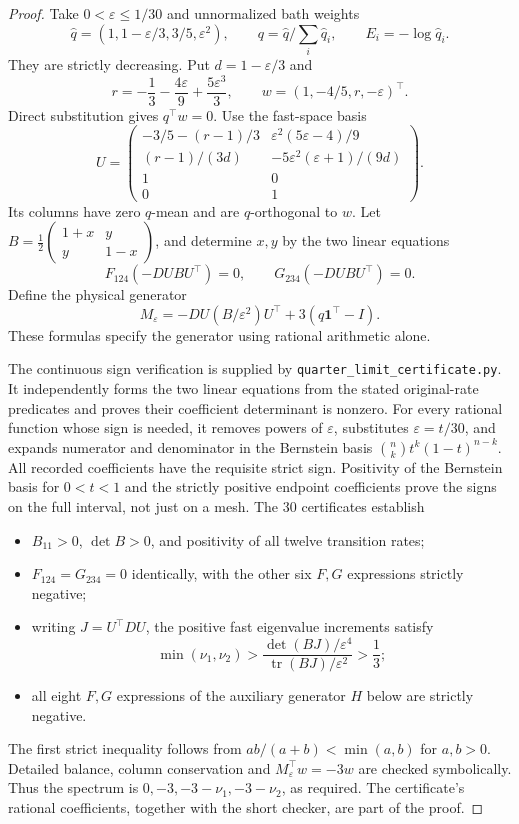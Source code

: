 \documentclass[11pt]{article}
\begin{document}
\begin{proof}
Take $0<\varepsilon\leq1/30$ and unnormalized bath weights
\[
\widehat q=(1,1-\varepsilon/3,3/5,\varepsilon^2),\qquad
q=\widehat q/\sum_i\widehat q_i,\qquad E_i=-\log\widehat q_i.
\]
They are strictly decreasing. Put $d=1-\varepsilon/3$ and
\[
r=-\frac13-\frac{4\varepsilon}{9}+\frac{5\varepsilon^3}{3},\qquad
w=(1,-4/5,r,-\varepsilon)^\top.
\]
Direct substitution gives $q^\top w=0$. Use the fast-space basis
\[
U=\begin{pmatrix}
-3/5-(r-1)/3&\varepsilon^2(5\varepsilon-4)/9\\
(r-1)/(3d)&-5\varepsilon^2(\varepsilon+1)/(9d)\\
1&0\\0&1
\end{pmatrix}.
\]
Its columns have zero $q$-mean and are $q$-orthogonal to $w$.
Let $B=\frac12\left(\begin{smallmatrix}1+x&y\\y&1-x\end{smallmatrix}\right)$,
and determine $x,y$ by the two linear equations
\[
F_{124}(-DUBU^\top)=0,\qquad G_{234}(-DUBU^\top)=0.
\]
Define the physical generator
\begin{equation}\label{eq:quartergenerator}
M_\varepsilon=-DU(B/\varepsilon^2)U^\top
       +3(q\mathbf1^\top-I).
\end{equation}
These formulas specify the generator using rational arithmetic alone.

The continuous sign verification is supplied by
\texttt{quarter\_limit\_certificate.py}. It independently forms the two
linear equations from the stated original-rate predicates and proves their
coefficient determinant is nonzero. For every rational function whose sign
is needed, it removes powers of $\varepsilon$, substitutes
$\varepsilon=t/30$, and expands numerator and denominator in the Bernstein
basis $\binom nk t^k(1-t)^{n-k}$. All recorded coefficients have the requisite
strict sign. Positivity of the Bernstein basis for $0<t<1$ and the strictly
positive endpoint coefficients prove the signs on the full interval,
not just on a mesh. The 30 certificates establish
\begin{itemize}
\item $B_{11}>0$, $\det B>0$, and positivity of all twelve transition rates;
\item $F_{124}=G_{234}=0$ identically, with the other six $F,G$ expressions
strictly negative;
\item writing $J=U^\top DU$, the positive fast eigenvalue increments satisfy
\[
\min(\nu_1,\nu_2)>
\frac{\det(BJ)/\varepsilon^4}{\operatorname{tr}(BJ)/\varepsilon^2}
>\frac13;
\]
\item all eight $F,G$ expressions of the auxiliary generator $H$ below are
strictly negative.
\end{itemize}
The first strict inequality follows from $ab/(a+b)<\min(a,b)$ for $a,b>0$.
Detailed balance, column conservation and $M_\varepsilon^\top w=-3w$ are
checked symbolically. Thus the spectrum is
$0,-3,-3-\nu_1,-3-\nu_2$, as required. The certificate's rational
coefficients, together with the short checker, are part of the proof.


\end{proof}
\end{document}
